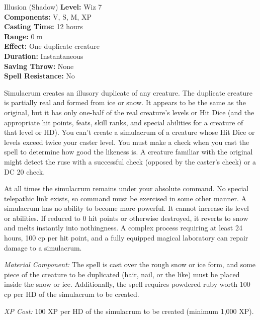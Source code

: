 {Illusion (Shadow)}
{
	\textbf{Level:}
	Wiz 7\\
	\textbf{Components:}
	V, S, M, XP\\
	\textbf{Casting Time:}
	12 hours\\
	\textbf{Range:}
	0 m\\
	\textbf{Effect:}
	One duplicate creature\\
	\textbf{Duration:}
	Instantaneous\\
	\textbf{Saving Throw:}
	None\\
	\textbf{Spell Resistance:}
	No\\
}
{
	Simulacrum creates an illusory duplicate of any creature. The duplicate creature is partially real and formed from ice or snow. It appears to be the same as the original, but it has only one-half of the real creature's levels or Hit Dice (and the appropriate hit points, feats, skill ranks, and special abilities for a creature of that level or HD). You can't create a simulacrum of a creature whose Hit Dice or levels exceed twice your caster level. You must make a  check when you cast the spell to determine how good the likeness is. A creature familiar with the original might detect the ruse with a successful  check (opposed by the caster's  check) or a DC 20  check.

	At all times the simulacrum remains under your absolute command. No special telepathic link exists, so command must be exercised in some other manner. A simulacrum has no ability to become more powerful. It cannot increase its level or abilities. If reduced to 0 hit points or otherwise destroyed, it reverts to snow and melts instantly into nothingness. A complex process requiring at least 24 hours, 100 cp per hit point, and a fully equipped magical laboratory can repair damage to a simulacrum.

	\textit{Material Component:}
	The spell is cast over the rough snow or ice form, and some piece of the creature to be duplicated (hair, nail, or the like) must be placed inside the snow or ice. Additionally, the spell requires powdered ruby worth 100 cp per HD of the simulacrum to be created.

	\textit{XP Cost:}
	100 XP per HD of the simulacrum to be created (minimum 1,000 XP).

}
